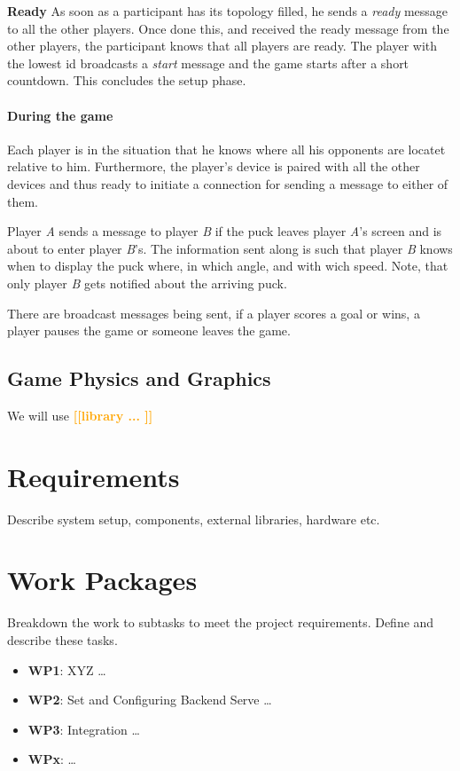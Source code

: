 \documentclass{report}
\newcommand{\todo}[1]{\textsf{\textbf{\textcolor{orange}{[[#1]]}}}}
\begin{document}
\textbf{Ready} As soon as a participant has its topology filled, he sends a \textit{ready} message to all the other players. Once done this, and received the ready message from the other players, the participant knows that all players are ready. The player with the lowest id broadcasts a \textit{start} message and the game starts after a short countdown. This concludes the setup phase. 

\paragraph{During the game} Each player is in the situation that he knows where all his opponents are locatet relative to him. Furthermore, the player's device is paired with all the other devices and thus ready to initiate a connection for sending a message to either of them.

Player \textit{A} sends a message to player \textit{B} if the puck leaves player \textit{A}'s screen and is about to enter player \textit{B}'s. The information sent along is such that player \textit{B} knows when to display the puck where, in which angle, and with wich speed. Note, that only player \textit{B} gets notified about the arriving puck.

There are broadcast messages being sent, if a player scores a goal or wins, a player pauses the game or someone leaves the game.

\subsection{Game Physics and Graphics} We will use \todo{library ... } 


\section{Requirements}
Describe system setup, components, external libraries, hardware etc.

\section{Work Packages}
Breakdown the work to subtasks to meet the project requirements.
Define and describe these tasks.

\begin{itemize}
        \item {\bf WP1}:  XYZ  \ldots    
        \item {\bf WP2}: Set and Configuring Backend Serve  \ldots    
        \item {\bf WP3}: Integration  \ldots 
         \item {\bf WPx}:  \ldots 
\end{itemize}
 
\end{document}
